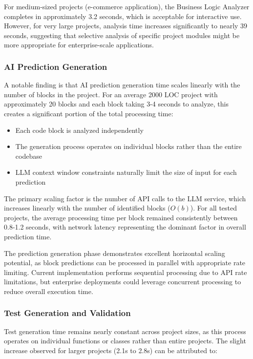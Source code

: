 For medium-sized projects (e-commerce application), the Business Logic Analyzer completes in approximately 3.2 seconds, which is acceptable for interactive use. However, for very large projects, analysis time increases significantly to nearly 39 seconds, suggesting that selective analysis of specific project modules might be more appropriate for enterprise-scale applications.

\subsubsection{AI Prediction Generation}

A notable finding is that AI prediction generation time scales linearly with the number of blocks in the project. For an average 2000 LOC project with approximately 20 blocks and each block taking 3-4 seconds to analyze, this creates a significant portion of the total processing time:

\begin{itemize}
    \item Each code block is analyzed independently
    \item The generation process operates on individual blocks rather than the entire codebase
    \item LLM context window constraints naturally limit the size of input for each prediction
\end{itemize}

The primary scaling factor is the number of API calls to the LLM service, which increases linearly with the number of identified blocks ($O(b)$). For all tested projects, the average processing time per block remained consistently between 0.8-1.2 seconds, with network latency representing the dominant factor in overall prediction time.

The prediction generation phase demonstrates excellent horizontal scaling potential, as block predictions can be processed in parallel with appropriate rate limiting. Current implementation performs sequential processing due to API rate limitations, but enterprise deployments could leverage concurrent processing to reduce overall execution time.

\subsubsection{Test Generation and Validation}

Test generation time remains nearly constant across project sizes, as this process operates on individual functions or classes rather than entire projects. The slight increase observed for larger projects (2.1s to 2.8s) can be attributed to:

